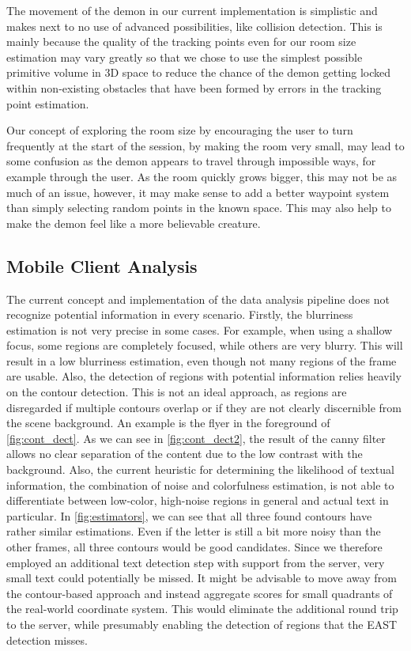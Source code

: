 The movement of the demon in our current implementation is simplistic and makes next to no use of advanced possibilities, like collision detection.
This is mainly because the quality of the tracking points even for our room size estimation may vary greatly so that we chose to use the simplest possible primitive volume in 3D space to reduce the chance of the demon getting locked within non-existing obstacles that have been formed by errors in the tracking point estimation.

Our concept of exploring the room size by encouraging the user to turn frequently at the start of the session, by making the room very small, may lead to some confusion as the demon appears to travel through impossible ways, for example through the user.
As the room quickly grows bigger, this may not be as much of an issue, however, it may make sense to add a better waypoint system than simply selecting random points in the known space.
This may also help to make the demon feel like a more believable creature.

\subsection{Mobile Client Analysis}
The current concept and implementation of the data analysis pipeline does not recognize potential information in every scenario.
Firstly, the blurriness estimation is not very precise in some cases. For example, when using a shallow focus, some regions are completely focused, while others are very blurry. This will result in a low blurriness estimation, even though not many regions of the frame are usable.
Also, the detection of regions with potential information relies heavily on the contour detection.
This is not an ideal approach, as regions are disregarded if multiple contours overlap or if they are not clearly discernible from the scene background.
An example is the flyer in the foreground of \autoref{fig:cont_dect}. As we can see in \autoref{fig:cont_dect2}, the result of the canny filter allows no clear separation of the content due to the low contrast with the background.
Also, the current heuristic for determining the likelihood of textual information, the combination of noise and colorfulness estimation, is not able to differentiate between low-color, high-noise regions in general and actual text in particular. In \autoref{fig:estimators}, we can see that all three found contours have rather similar estimations. Even if the letter is still a bit more noisy than the other frames, all three contours would be good candidates.
Since we therefore employed an additional text detection step with support from the server, very small text could potentially be missed.
It might be advisable to move away from the contour-based approach and instead aggregate scores for small quadrants of the real-world coordinate system.
This would eliminate the additional round trip to the server, while presumably enabling the detection of regions that the EAST detection misses.

